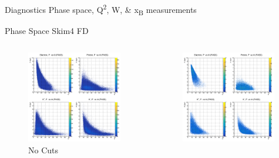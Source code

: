 \documentclass[aspectratio=169]{beamer}
\begin{document}
\begin{frame}{Diagnostics}
\centering
    \Huge{Phase space, Q\textsuperscript{2}, W, \& x\textsubscript{B} measurements}
\end{frame}

\begin{frame}{Phase Space  \hfill Skim4 FD}
\vspace*{-0.6cm}
    \begin{columns}
    \begin{figure}
        \centering
        \includegraphics[width=0.97\textwidth]{pdfs/hists/PASS/ThetaP.png}
        \caption{No Cuts}
    \end{figure}
    \begin{figure}
        \centering
        \includegraphics[width=0.97\textwidth]{pdfs/all_cuts/PASS/ThetaP.png}

\end{figure}
\end{columns}
\end{frame}
\end{document}
